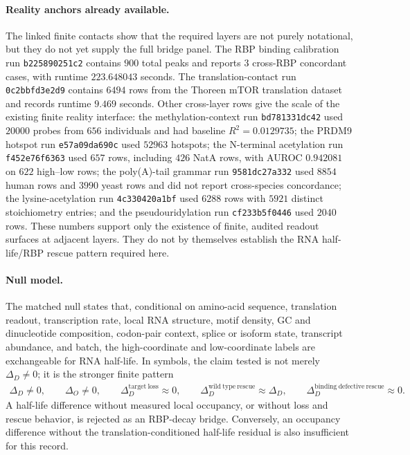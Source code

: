 \paragraph{Reality anchors already available.}
The linked finite contacts show that the required layers are not purely notational, but they do not yet supply the full bridge panel.  The RBP binding calibration run \texttt{b225890251c2} contains $900$ total peaks and reports $3$ cross-RBP concordant cases, with runtime $223.648043$ seconds.  The translation-contact run \texttt{0c2bbfd3e2d9} contains $6494$ rows from the Thoreen mTOR translation dataset and records runtime $9.469$ seconds.  Other cross-layer rows give the scale of the existing finite reality interface: the methylation-context run \texttt{bd781331dc42} used $20000$ probes from $656$ individuals and had baseline $R^2=0.0129735$; the PRDM9 hotspot run \texttt{e57a09da690c} used $52963$ hotspots; the N-terminal acetylation run \texttt{f452e76f6363} used $657$ rows, including $426$ NatA rows, with AUROC $0.942081$ on $622$ high--low rows; the poly(A)-tail grammar run \texttt{9581dc27a332} used $8854$ human rows and $3990$ yeast rows and did not report cross-species concordance; the lysine-acetylation run \texttt{4c330420a1bf} used $6288$ rows with $5921$ distinct stoichiometry entries; and the pseudouridylation run \texttt{cf233b5f0446} used $2040$ rows.  These numbers support only the existence of finite, audited readout surfaces at adjacent layers.  They do not by themselves establish the RNA half-life/RBP rescue pattern required here.

\paragraph{Null model.}
The matched null states that, conditional on amino-acid sequence, translation readout, transcription rate, local RNA structure, motif density, GC and dinucleotide composition, codon-pair context, splice or isoform state, transcript abundance, and batch, the high-coordinate and low-coordinate labels are exchangeable for RNA half-life.  In symbols, the claim tested is not merely $\Delta_D \neq 0$; it is the stronger finite pattern
$$
\begin{aligned}
\Delta_D \neq 0,
\qquad
\Delta_O \neq 0,
\qquad
\Delta_D^{\mathrm{target\ loss}} \approx 0,
\qquad
\Delta_D^{\mathrm{wild\ type\ rescue}} \approx \Delta_D,
\qquad
\Delta_D^{\mathrm{binding\ defective\ rescue}} \approx 0.
\end{aligned}
$$
A half-life difference without measured local occupancy, or without loss and rescue behavior, is rejected as an RBP-decay bridge.  Conversely, an occupancy difference without the translation-conditioned half-life residual is also insufficient for this record.

